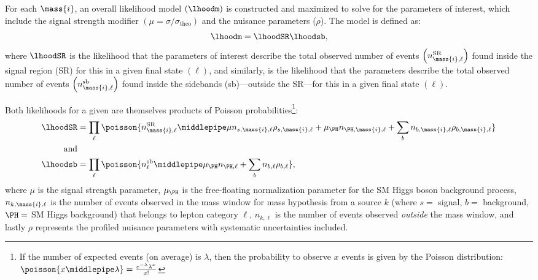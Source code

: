 For each $\mass{i}$, an overall likelihood model $(\lhoodm)$ is constructed and maximized to solve for the parameters of interest, which include the signal strength modifier $\left( \mu = \sigma / \sigma_\text{theo} \right)$ and the nuisance parameters ($\rho$).
The model is defined as:
\begin{equation*}
    \lhoodm =
    \lhoodSR %
    \lhoodsb, %
\end{equation*}
where $\lhoodSR$ is the likelihood that the parameters of interest describe the total observed number of events $\left( n^\text{SR}_{\mass{i}, \ell} \right)$ found inside the signal region (SR) for this  in a given final state $(\ell)$,
and similarly, \lhoodsb is the likelihood that the parameters describe the total observed number of events $\left( n^\text{sb}_{\mass{i}, \ell} \right)$ found inside the sidebands (sb)---\ie outside the SR---for this  in a given final state $(\ell)$.

Both likelihoods for a given  are themselves products of Poisson probabilities\footnote
{
    If the number of expected events (on average) is $\lambda$, then the probability to observe $x$ events is given by the Poisson distribution:
    $\poisson{x \middlepipe \lambda} = \frac{e^{-\lambda} \lambda^x}{x!}$
}:
\begin{align*}
    \lhoodSR &= \prod_\ell{
        \poisson{
            n^\text{SR}_{\mass{i},\ell}
            \middlepipe
            \mu n_{s, \mass{i}, \ell} \rho_{s, \mass{i}, \ell} + \mu_\PH n_{\PH, \mass{i}, \ell} + 
            \sum_b{
                n_{b, \mass{i}, \ell} \rho_{b, \mass{i}, \ell}
                }
            }
    }
    \\
    \text{and} &
    \\
    \lhoodsb &= \prod_\ell{
        \poisson{
            n^\text{sb}_{\ell}
            \middlepipe
            \mu_\PH n_{\PH, \ell} + 
            \sum_b{
                n_{b, \ell} \rho_{b, \ell}
                }
            }
    },
\end{align*}
where $\mu$ is the signal strength parameter,
$\mu_\PH$ is the free-floating normalization parameter for the SM Higgs boson background process,
$n_{k, \mass{i}, \ell}$ is the number of events observed in the mass window for mass hypothesis  from a source $k$ (where $s=$ signal, $b=$ background, $\PH=$ SM Higgs background) that belongs to lepton category $\ell$,
$n_{k, \ell}$ is the number of events observed \emph{outside} the mass window,
and lastly $\rho$ represents the profiled nuisance parameters with systematic uncertainties included.

